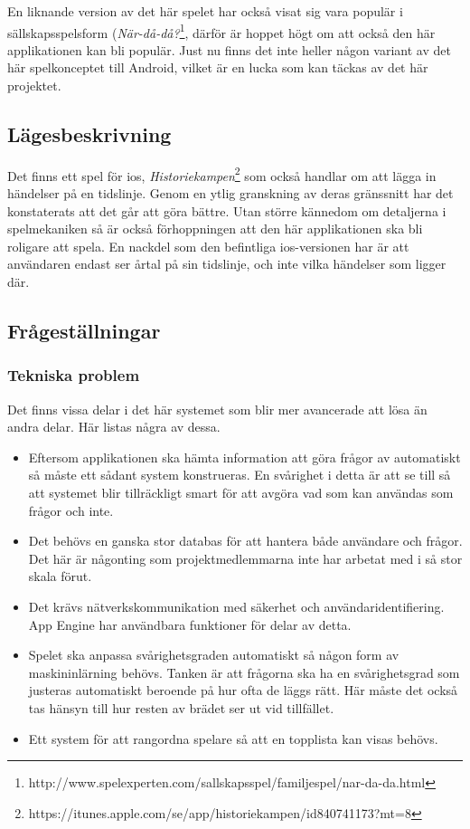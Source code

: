 \documentclass[swedish,12pt,a4paper]{article}
\begin{document}
En liknande version av det här spelet har också visat sig vara populär i sällskapsspelsform (\textit{När-då-då?}\footnote{http://www.spelexperten.com/sallskapsspel/familjespel/nar-da-da.html}, därför är hoppet högt om att också den här applikationen kan bli populär. Just nu finns det inte heller någon variant av det här spelkonceptet till Android, vilket är en lucka som kan täckas av det här projektet.
\subsection{Lägesbeskrivning}
Det finns ett spel för ios, \textit{Historiekampen}\footnote{https://itunes.apple.com/se/app/historiekampen/id840741173?mt=8} som också handlar om att lägga in händelser på en tidslinje. Genom en ytlig granskning av deras gränssnitt har det konstaterats att det går att göra bättre. Utan större kännedom om detaljerna i spelmekaniken så är också förhoppningen att den här applikationen ska bli roligare att spela. En nackdel som den befintliga ios-versionen har är att användaren endast ser årtal på sin tidslinje, och inte vilka händelser som ligger där.
\subsection{Frågeställningar}
\subsubsection{Tekniska problem}
Det finns vissa delar i det här systemet som blir mer avancerade att lösa än andra delar. Här listas några av dessa.
\begin{itemize}
\item Eftersom applikationen ska hämta information att göra frågor av automatiskt så måste ett sådant system konstrueras. En svårighet i detta är att se till så att systemet blir tillräckligt smart för att avgöra vad som kan användas som frågor och inte.
\item Det behövs en ganska stor databas för att hantera både användare och frågor. Det här är någonting som projektmedlemmarna inte har arbetat med i så stor skala förut.
\item Det krävs nätverkskommunikation med säkerhet och användaridentifiering. App Engine har användbara funktioner för delar av detta.
\item Spelet ska anpassa svårighetsgraden automatiskt så någon form av maskininlärning behövs. Tanken är att frågorna ska ha en svårighetsgrad som justeras automatiskt beroende på hur ofta de läggs rätt. Här måste det också tas hänsyn till hur resten av brädet ser ut vid tillfället.
\item Ett system för att rangordna spelare så att en topplista kan visas behövs.
\end{itemize}
\end{document}
